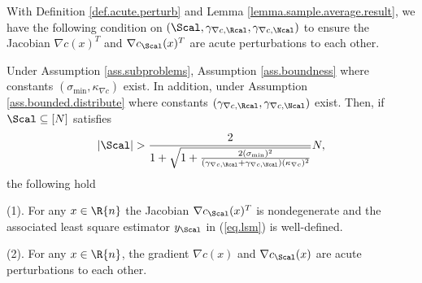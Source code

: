 
With Definition \ref{def.acute.perturb} and Lemma \ref{lemma.sample.average.result}, we have the following condition on $(\Scal,\gamma_{\nabla c, \Rcal},\gamma_{\nabla c, \Ncal})$ to ensure the Jacobian $\nabla c(x)^T$ and $\nabla c_{\Scal}(x)^T$ are acute perturbations to each other.

\begin{lemma}
\label{lemma.acute.perturb}
	Under Assumption \ref{ass.subproblems}, Assumption \ref{ass.boundness} where constants $(\sigma_{\min},\kappa_{\nabla c})$ exist. In addition, under Assumption \ref{ass.bounded.distribute} where constants $(\gamma_{\nabla c, \Rcal},\gamma_{\nabla c, \Ncal})$ exist. Then, if $\Scal\subseteq[N]$ satisfies 
	\[
	|\Scal|>\frac{2}{1+\sqrt{1+\frac{2(\sigma_{\min})^2}{(\gamma_{\nabla c, \Rcal}+\gamma_{\nabla c, \Ncal})(\kappa_{\nabla c})^2}}}N ,
	\]
	the following hold 
	\bitemize 
	\item[(1).]For any $x\in\R{n}$ the Jacobian $\nabla c_{\Scal}(x)^T$ is nondegenerate and the associated least square estimator $y_{\Scal}$ in (\ref{eq.lsm}) is well-defined.
	\item[(2).] For any $x\in\R{n}$, the gradient $\nabla c(x)$ and $\nabla c_{\Scal}(x)$ are acute perturbations to each other.	
	\eitemize
\end{lemma}

